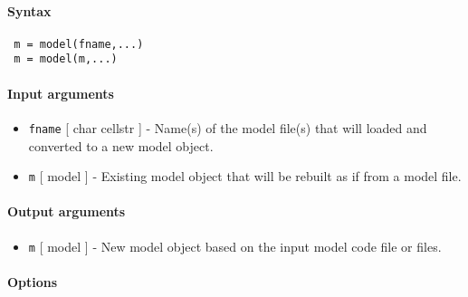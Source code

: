 


	\paragraph{Syntax}
 
 \begin{verbatim}
 m = model(fname,...)
 m = model(m,...)
 \end{verbatim}
 
 \paragraph{Input arguments}
 
 \begin{itemize}
 \item
   \texttt{fname} {[} char \textbar{} cellstr {]} - Name(s) of the model
   file(s) that will loaded and converted to a new model object.
 \item
   \texttt{m} {[} model {]} - Existing model object that will be rebuilt
   as if from a model file.
 \end{itemize}
 
 \paragraph{Output arguments}
 
 \begin{itemize}
 \item
   \texttt{m} {[} model {]} - New model object based on the input model
   code file or files.
 \end{itemize}
 
 \paragraph{Options}
 

